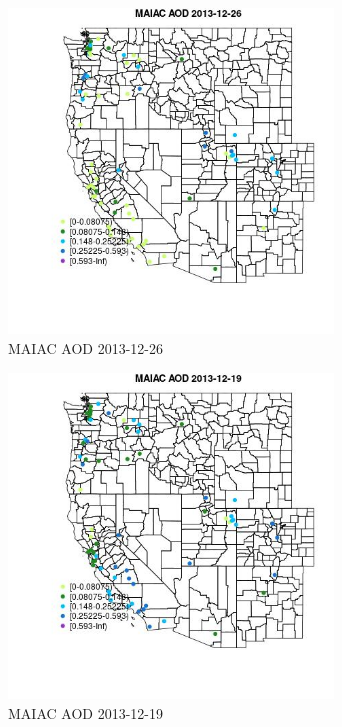 \begin{figure} 
\centering  
\includegraphics[width=0.77\textwidth]{Code_Outputs/Report_ML_input_PM25_Step4_part_e_de_duplicated_aves_MapObsMAIAC_AOD2013-12-26.jpg} 
\caption{\label{fig:Report_ML_input_PM25_Step4_part_e_de_duplicated_avesMapObsMAIAC_AOD2013-12-26}MAIAC AOD 2013-12-26} 
\end{figure} 
 

\begin{figure} 
\centering  
\includegraphics[width=0.77\textwidth]{Code_Outputs/Report_ML_input_PM25_Step4_part_e_de_duplicated_aves_MapObsMAIAC_AOD2013-12-19.jpg} 
\caption{\label{fig:Report_ML_input_PM25_Step4_part_e_de_duplicated_avesMapObsMAIAC_AOD2013-12-19}MAIAC AOD 2013-12-19} 
\end{figure} 
 

